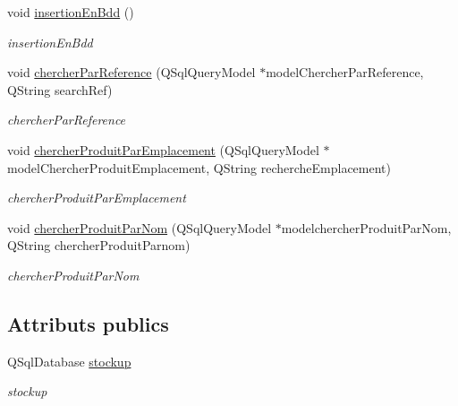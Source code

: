 \begin{DoxyCompactItemize}
\mbox{\label{class_base_de_donnees_a1aa6b997245767e4ba75973d59dcfaf6}} 
void \mbox{\hyperlink{class_base_de_donnees_a1aa6b997245767e4ba75973d59dcfaf6}{insertion\+En\+Bdd}} ()
\begin{DoxyCompactList}\small\item\em insertion\+En\+Bdd \end{DoxyCompactList}\item 
void \mbox{\hyperlink{class_base_de_donnees_aaa4a62ca5864ce24cb0b3d488a609811}{chercher\+Par\+Reference}} (Q\+Sql\+Query\+Model $\ast$model\+Chercher\+Par\+Reference, Q\+String search\+Ref)
\begin{DoxyCompactList}\small\item\em chercher\+Par\+Reference \end{DoxyCompactList}\item 
void \mbox{\hyperlink{class_base_de_donnees_a7741ad517714e619d7f8a0f202d3b38d}{chercher\+Produit\+Par\+Emplacement}} (Q\+Sql\+Query\+Model $\ast$model\+Chercher\+Produit\+Emplacement, Q\+String recherche\+Emplacement)
\begin{DoxyCompactList}\small\item\em chercher\+Produit\+Par\+Emplacement \end{DoxyCompactList}\item 
void \mbox{\hyperlink{class_base_de_donnees_a49d9a59025c2342adc820849bffb5532}{chercher\+Produit\+Par\+Nom}} (Q\+Sql\+Query\+Model $\ast$modelchercher\+Produit\+Par\+Nom, Q\+String chercher\+Produit\+Parnom)
\begin{DoxyCompactList}\small\item\em chercher\+Produit\+Par\+Nom \end{DoxyCompactList}\end{DoxyCompactItemize}
\subsection*{Attributs publics}
\begin{DoxyCompactItemize}
\item 
\mbox{\label{class_base_de_donnees_a2527e35f95ca7abc94d61eabe2b8ef17}} 
Q\+Sql\+Database \mbox{\hyperlink{class_base_de_donnees_a2527e35f95ca7abc94d61eabe2b8ef17}{stockup}}
\begin{DoxyCompactList}\small\item\em stockup \end{DoxyCompactList}\end{DoxyCompactItemize}


